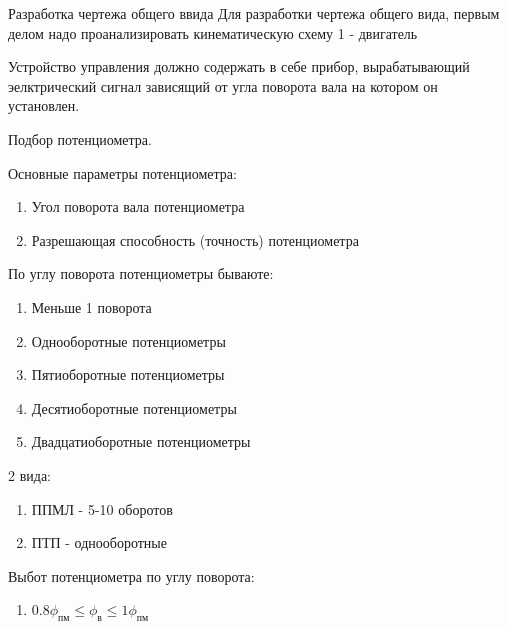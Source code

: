 \documentclass{article}
\begin{document}
Разработка чертежа общего ввида
Для разработки чертежа общего вида, первым делом надо проанализировать кинематическую схему
1 - двигатель

Устройство управления должно содержать в себе прибор, вырабатывающий эелктрический сигнал зависящий от угла поворота вала на котором он установлен.

Подбор потенциометра.

Основные параметры потенциометра:
\begin{enumerate}
	\item Угол поворота вала потенциометра
	\item Разрешающая способность (точность) потенциометра
\end{enumerate}
По углу поворота потенциометры бываюте:
\begin{enumerate}
	\item Меньше 1 поворота
	\item Однооборотные потенциометры
	\item Пятиоборотные потенциометры
	\item Десятиоборотные потенциометры
	\item Двадцатиоборотные потенциометры
\end{enumerate}

2 вида:
\begin{enumerate}
	\item ППМЛ - 5-10 оборотов
	\item ПТП - однооборотные
\end{enumerate}

Выбот потенциометра по углу поворота:
\begin{enumerate}
	\item $0.8 \phi_{пм} \le \phi_{в} \le 1 \phi_{пм}$
\end{enumerate}
\end{document}
